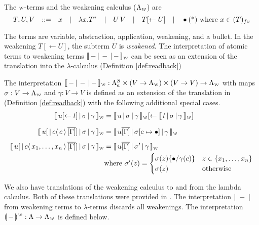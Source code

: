 \documentclass[a4paper,UKenglish,cleveref, autoref]{lipics-v2019}
\newcommand{\FALC}{\Lambda^{S}_{a}}
\newcommand{\WEAK}{\Lambda_{\weaksymbol}}
\newcommand{\fv}[1]{(#1)_{fv}}
\newcommand{\set}[1]{ \{ #1 \} }
\newcommand{\abs}[2]{\lambda #1 . #2}
\newcommand{\app}[2]{#1 \, #2}
\newcommand{\share}[3]{#1 [#2 \leftarrow #3]}
\newcommand{\dist}[5]{#1 [ #2 \, \vert \, \fakedist{#4}{#5} \, #3 ]}
\newcommand{\fakedist}[2]{#1 \langle \, #2 \, \rangle}
\newcommand{\sub}[3]{#1 \{ #2 / #3 \}}
\newcommand{\weaksymbol}{\mbox{\tiny $\mathcal{W}$}}
\newcommand{\readweakwmap}[3]{\llbracket \, #1 \, \vert \, #2 \, \vert \, #3  \, \rrbracket_{\weaksymbol} }
\newcommand{\compweak}[1]{\llparenthesis \, #1 \, \rrparenthesis^{\weaksymbol}}
\newcommand{\readbackweak}[1]{\lfloor \, #1 \, \rfloor}
\begin{document}
\begin{definition}
\label{def:weakterms}
The $\weaksymbol$-terms and the weakening calculus ($\WEAK$) are
\begin{equation*}
	T, U, V \quad {:}{:}{=} \quad x \quad \vert \quad \abs{x}{T^{*}}\quad \vert \quad \app{U}{V} \quad \vert \quad \share{T}{}{U} \quad \vert \quad \bullet \hfill \text{(*) where $x \in \fv{T}$}
\end{equation*}
\end{definition}

The terms are variable, abstraction, application, weakening, and a bullet. In the weakening $\share{T}{}{U}$, the subterm $U$ is \emph{weakened}. The interpretation of atomic terms to weakening terms $\readweakwmap{-}{-}{-}$ can be seen as an extension of the translation into the $\lambda$-calculus (Definition \ref{def:readback})

\begin{definition}
\label{def:transfalcweak}
	The interpretation $\readweakwmap{-}{-}{-} : \FALC \times (V \rightarrow \WEAK) \times (V \rightarrow V) \rightarrow \WEAK$ with maps $\sigma : V \rightarrow \WEAK$ and $\gamma : V \rightarrow V$ is defined as an extension of the translation in (Definition \ref{def:readback}) with the following additional special cases.
	\begin{align*}
		\readweakwmap{\share{u}{}{t}}{\sigma}{\gamma} &= \share{\readweakwmap{u}{\sigma}{\gamma}}{}{\readweakwmap{t}{\sigma}{\gamma}} \\[0.2cm]
		\readweakwmap{\dist{u}{}{\overline{[\Gamma]}}{c}{c}}{\sigma}{\gamma} &= \readweakwmap{u \overline{[\Gamma]}}{\sigma[c \mapsto \bullet]}{\gamma} \\[0.2cm]
		\readweakwmap{\dist{u}{}{\overline{[\Gamma]}}{c}{x_{1}, \dots, x_{n}}}{\sigma}{\gamma} &= \readweakwmap{u \overline{[\Gamma]}}{\sigma'}{\gamma} \\
		& \text{where } \sigma'(z) = \begin{cases} \sigma(z) \sub{}{\bullet}{\gamma(c)} & z \in \set{x_{1}, \dots, x_{n}} \\ \sigma(z) & \text{otherwise} \end{cases} \\
	\end{align*}
\end{definition}

\noindent We also have translations of the weakening calculus to and from the lambda calculus. Both of these translations were provided in  \cite{gundersen2013atomic}. The interpretation $\readbackweak{-}$ from weakening terms to $\lambda$-terms discards all weakenings. The interpretation $\compweak{-} : \Lambda \rightarrow \WEAK$ is defined below.
\end{document}
